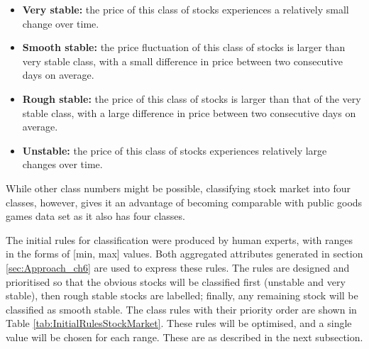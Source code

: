 \begin{itemize}
    \item \textbf{Very stable:} the price of this class of stocks experiences a relatively small change over time.
    
    \item \textbf{Smooth stable:} the price fluctuation of this class of stocks is larger than very stable class, with a small difference in price between two consecutive days on average.
    
    \item \textbf{Rough stable:} the price of this class of stocks is larger than that of the very stable class, with a large difference in price between two consecutive days on average.
    
    \item \textbf{Unstable:} the price of this class of stocks experiences relatively large changes over time.
\end{itemize}

While other class numbers might be possible, classifying stock market into four classes, however, gives it an advantage of becoming comparable with public goods games data set as it also has four classes.

The initial rules for classification were produced by human experts, with ranges in the forms of [min, max] values. Both aggregated attributes  generated in section \ref{sec:Approach_ch6} are used to express these rules. The rules are designed and prioritised so that the obvious stocks will be classified first (unstable and very stable), then rough stable stocks are labelled; finally, any remaining stock will be classified as smooth stable. The class rules with their priority order are shown in Table \ref{tab:InitialRulesStockMarket}. These rules will be optimised, and a single value will be chosen for each range. These are as described in the next subsection.

